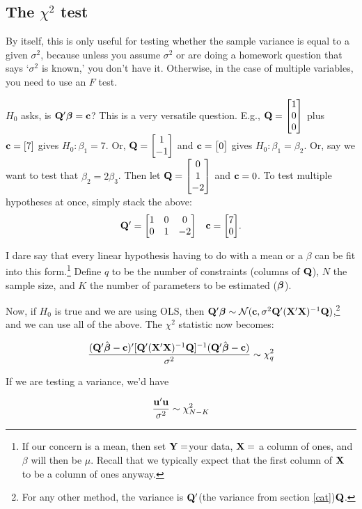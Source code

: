 \subsection{The $\chi^2$ test}

By itself, this is only useful for testing whether the sample variance
is equal to a given $\sigma^2$, because unless you assume $\sigma^2$ 
or are doing a homework question that says `$\sigma^2$
is known,' you don't have it. Otherwise, in the case of multiple variables, you need to use
an $F$ test.

$H_0$ asks, is ${{\bf Q}'
{\mbox{\boldmath$\beta$}}} = {\bf c}$?  This is a very versatile question. E.g., ${\bf Q} =
\left[\begin{matrix}1\cr 0\cr 0\end{matrix}\right]$ plus ${\bf c} = [7]$ gives $H_0: \beta_1 = 7$. Or, ${\bf Q} = \left[\begin{matrix}1 \cr
-1\end{matrix}\right]$ and ${\bf c} = \left[\begin{matrix}0\end{matrix}\right]$ gives $H_0: \beta_1=\beta_2$. 
Or, say we want to test that $\beta_2 = 2\beta_3$. Then let ${\bf Q}=\left[\begin{matrix}0 \cr 1 \cr -2\end{matrix}\right]$ and ${\bf c} = 0$.
To test multiple hypotheses at once, simply stack the above:
\begin{equation}
\begin{matrix}{\bf Q}' = \left[\begin{matrix}1 & 0 & 0  \cr
                0 &1 &-2\end{matrix}\right] 
                & {\bf c} = \left[\begin{matrix}7 \cr 0\end{matrix}\right]\end{matrix}.\label{qc}\end{equation}

I dare
say that every linear hypothesis having to do with a mean or a $\beta$ can be
fit into this form.\footnote{If our concern is a mean, then set
${\bf Y}=$your data, ${\bf X}=$ a column of ones, and $\beta$ will then be
$\mu$. Recall that we typically expect that the first column of ${\bf X}$ to
be a column of ones anyway.}
Define $q$ to be the number of constraints (columns
of ${\bf Q}$), $N$ the sample size, and $K$ the number of parameters to be
estimated (${\mbox{\boldmath$\beta$}}$).

Now, if $H_0$ is true and we are using OLS, then ${\bf Q}' {\mbox{\boldmath$\beta$}} \sim {\cal
N}({\bf c}, \sigma^2 {\bf Q}' ({\bf X}'{\bf X})^{-1} {\bf Q})$,\footnote{For any other
method, the variance is ${\bf Q}'$(the variance from section
\ref{cat})${\bf Q}$.} and we can use all of the above. The $\chi^2$
statistic now becomes:

\begin{equation}		\label{chi1}
{({\bf Q}'\hat{{\mbox{\boldmath$\beta$}}}- {\bf c})' [{\bf Q}' ({\bf X}'{\bf X})^{-1} {\bf Q}]^{-1} ({\bf Q}' \hat{{\mbox{\boldmath$\beta$}}}- {\bf c})
\over \sigma^2} \sim \chi^2_q
\end{equation}

If we are testing a variance, we'd have 

\begin{equation}		\label{chi2}
{{\bf u}' {\bf u} \over \sigma^2} \sim \chi^2_{N-K}
\end{equation}


